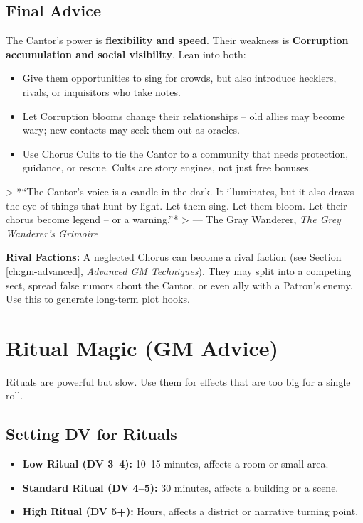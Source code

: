 \subsection*{Final Advice}
\label{subsec:cantor-final-gm}
The Cantor’s power is \textbf{flexibility and speed}. Their weakness is \textbf{Corruption accumulation and social visibility}. Lean into both:
\begin{itemize}
  \item Give them opportunities to sing for crowds, but also introduce hecklers, rivals, or inquisitors who take notes.
  \item Let Corruption blooms change their relationships – old allies may become wary; new contacts may seek them out as oracles.
  \item Use Chorus Cults to tie the Cantor to a community that needs protection, guidance, or rescue. Cults are story engines, not just free bonuses.
\end{itemize}

> *“The Cantor’s voice is a candle in the dark. It illuminates, but it also draws the eye of things that hunt by light. Let them sing. Let them bloom. Let their chorus become legend – or a warning.”*  
> — The Gray Wanderer, \textit{The Grey Wanderer’s Grimoire}

\textbf{Rival Factions:} A neglected Chorus can become a rival faction (see Section \ref{ch:gm-advanced}, \textit{Advanced GM Techniques}). They may split into a competing sect, spread false rumors about the Cantor, or even ally with a Patron’s enemy. Use this to generate long‑term plot hooks.

\section{Ritual Magic (GM Advice)}
\label{sec:rituals-gm}

Rituals are powerful but slow. Use them for effects that are too big for a single roll.

\subsection*{Setting DV for Rituals}
\begin{itemize}
  \item \textbf{Low Ritual (DV 3–4):} 10–15 minutes, affects a room or small area.
  \item \textbf{Standard Ritual (DV 4–5):} 30 minutes, affects a building or a scene.
  \item \textbf{High Ritual (DV 5+):} Hours, affects a district or narrative turning point.
\end{itemize}


